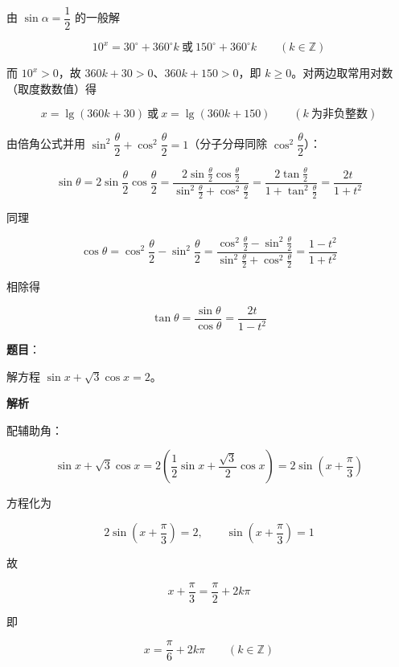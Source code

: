 \begin{answer}
由 $\sin\alpha=\dfrac{1}{2}$ 的一般解

\nopagebreak[4]
\[
10^{x}=30^{\circ}+360^{\circ}k\ \text{或}\ 150^{\circ}+360^{\circ}k\qquad(k\in\mathbb{Z})
\]

而 $10^{x}>0$，故 $360k+30>0$、$360k+150>0$，即 $k\ge 0$。对两边取常用对数（取度数数值）得

\nopagebreak[4]
\[
x=\lg(360k+30)\ \text{或}\ x=\lg(360k+150)\qquad(k\ \text{为非负整数})
\]


由倍角公式并用 $\sin^{2}\dfrac{\theta}{2}+\cos^{2}\dfrac{\theta}{2}=1$（分子分母同除 $\cos^{2}\dfrac{\theta}{2}$）：

\nopagebreak[4]
\[
\sin\theta=2\sin\frac{\theta}{2}\cos\frac{\theta}{2}
=\frac{2\sin\frac{\theta}{2}\cos\frac{\theta}{2}}{\sin^{2}\frac{\theta}{2}+\cos^{2}\frac{\theta}{2}}
=\frac{2\tan\frac{\theta}{2}}{1+\tan^{2}\frac{\theta}{2}}
=\frac{2t}{1+t^{2}}
\]

同理

\nopagebreak[4]
\[
\cos\theta=\cos^{2}\frac{\theta}{2}-\sin^{2}\frac{\theta}{2}
=\frac{\cos^{2}\frac{\theta}{2}-\sin^{2}\frac{\theta}{2}}{\sin^{2}\frac{\theta}{2}+\cos^{2}\frac{\theta}{2}}
=\frac{1-t^{2}}{1+t^{2}}
\]

相除得

\nopagebreak[4]
\[
\tan\theta=\frac{\sin\theta}{\cos\theta}
=\frac{2t}{1-t^{2}}
\]




\end{answer}
\begin{answer}

\textbf{题目}：

解方程 $\sin x+\sqrt{3}\cos x=2$。

\textbf{解析}

配辅助角：

\nopagebreak[4]
\[
\sin x+\sqrt{3}\cos x
=2\left(\frac{1}{2}\sin x+\frac{\sqrt{3}}{2}\cos x\right)
=2\sin\left(x+\frac{\pi}{3}\right)
\]

方程化为

\nopagebreak[4]
\[
2\sin\left(x+\frac{\pi}{3}\right)=2,\qquad \sin\left(x+\frac{\pi}{3}\right)=1
\]

故

\nopagebreak[4]
\[
x+\frac{\pi}{3}=\frac{\pi}{2}+2k\pi
\]

即

\nopagebreak[4]
\[
x=\frac{\pi}{6}+2k\pi\qquad(k\in\mathbb{Z})
\]


\end{answer}
